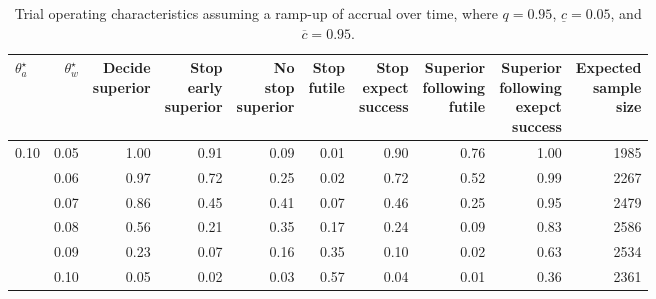 \documentclass{article}
\begin{document}
\begin{table}[!ht]
	\footnotesize
	\caption{\label{tab:oc1}Trial operating characteristics assuming a ramp-up of accrual over time, where $q=0.95$, $\underline{c}=0.05$, and $\overline{c}=0.95$.}
	\centering
	\begin{tabular}[t]{lrrrrrrrrr}
	\toprule
	$\theta_a^\star$ & $\theta_w^\star$ & \makecell{Decide\\superior} & \makecell{Stop\\early\\superior} & \makecell{No\\stop\\superior} & \makecell{Stop\\futile} & \makecell{Stop\\expect\\success} & \makecell{Superior\\following\\futile} & \makecell{Superior\\following\\exepct\\success} & \makecell{Expected\\sample\\size}\\
	\midrule
	0.10 & 0.05 & 1.00 & 0.91 & 0.09 & 0.01 & 0.90 & 0.76 & 1.00 & 1985 \\
	     & 0.06 & 0.97 & 0.72 & 0.25 & 0.02 & 0.72 & 0.52 & 0.99 & 2267 \\
	     & 0.07 & 0.86 & 0.45 & 0.41 & 0.07 & 0.46 & 0.25 & 0.95 & 2479 \\
	     & 0.08 & 0.56 & 0.21 & 0.35 & 0.17 & 0.24 & 0.09 & 0.83 & 2586 \\
	     & 0.09 & 0.23 & 0.07 & 0.16 & 0.35 & 0.10 & 0.02 & 0.63 & 2534 \\
	     & 0.10 & 0.05 & 0.02 & 0.03 & 0.57 & 0.04 & 0.01 & 0.36 & 2361 \\
	\bottomrule
	\end{tabular}
\end{table}
\end{document}
